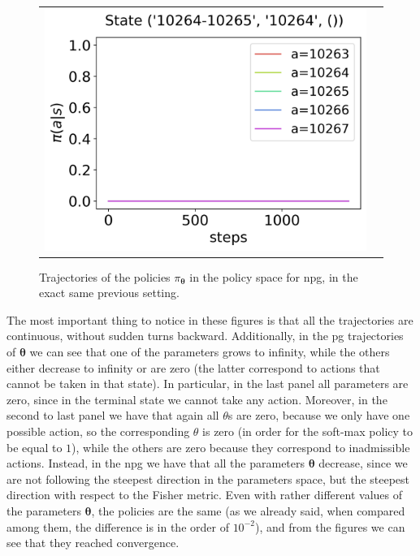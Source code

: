 \begin{figure}[!htp]
\begin{tabular}{cc}
        \hspace*{-18pt}\includegraphics[scale=0.36,valign=b]{chapters/figures/policy_NPG_state_3.png}
    \end{tabular}
    \caption{Trajectories of the policies $\pi_{\boldsymbol \theta}$ in the policy space for \acrshort{npg}, in the exact same previous setting.}
    \label{fig:sequence-policies-npg}
\end{figure}

The most important thing to notice in these figures is that all the trajectories are continuous, without sudden turns backward. Additionally, in the \acrshort{pg} trajectories of $\boldsymbol \theta$ we can see that one of the parameters grows to infinity, while the others either decrease to infinity or are zero (the latter correspond to actions that cannot be taken in that state). In particular, in the last panel all parameters are zero, since in the terminal state we cannot take any action. Moreover, in the second to last panel we have that again all $\theta$s are zero, because we only have one possible action, so the corresponding $\theta$ is zero (in order for the soft-max policy to be equal to $1$), while the others are zero because they correspond to inadmissible actions. Instead, in the \acrshort{npg} we have that all the parameters $\boldsymbol \theta$ decrease, since we are not following the steepest direction in the parameters space, but the steepest direction with respect to the Fisher metric. Even with rather different values of the parameters $\boldsymbol \theta$, the policies are the same (as we already said, when compared among them, the difference is in the order of $10^{-2}$), and from the figures we can see that they reached convergence.

